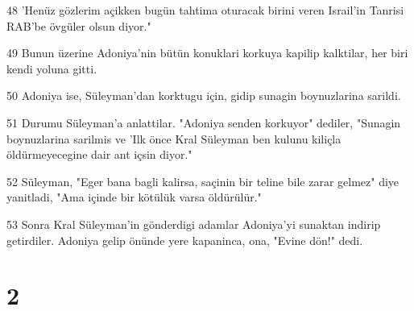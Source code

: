 \par 48 'Henüz gözlerim açikken bugün tahtima oturacak birini veren Israil'in Tanrisi RAB'be övgüler olsun diyor."
\par 49 Bunun üzerine Adoniya'nin bütün konuklari korkuya kapilip kalktilar, her biri kendi yoluna gitti.
\par 50 Adoniya ise, Süleyman'dan korktugu için, gidip sunagin boynuzlarina sarildi.
\par 51 Durumu Süleyman'a anlattilar. "Adoniya senden korkuyor" dediler, "Sunagin boynuzlarina sarilmis ve 'Ilk önce Kral Süleyman ben kulunu kiliçla öldürmeyecegine dair ant içsin diyor."
\par 52 Süleyman, "Eger bana bagli kalirsa, saçinin bir teline bile zarar gelmez" diye yanitladi, "Ama içinde bir kötülük varsa öldürülür."
\par 53 Sonra Kral Süleyman'in gönderdigi adamlar Adoniya'yi sunaktan indirip getirdiler. Adoniya gelip önünde yere kapaninca, ona, "Evine dön!" dedi.

\chapter{2}

